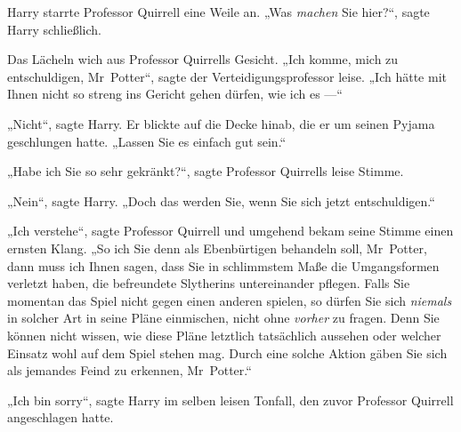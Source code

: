 Harry starrte Professor Quirrell eine Weile an.
„Was \emph{machen} Sie hier?“, sagte Harry schließlich.

Das Lächeln wich aus Professor Quirrells Gesicht.
„Ich komme, mich zu entschuldigen, Mr~Potter“, sagte der Verteidigungsprofessor leise.
„Ich hätte mit Ihnen nicht so streng ins Gericht gehen dürfen, wie ich es —“

„Nicht“, sagte Harry. Er blickte auf die Decke hinab, die er um seinen Pyjama geschlungen hatte.
„Lassen Sie es einfach gut sein.“

„Habe ich Sie so sehr gekränkt?“, sagte Professor Quirrells leise Stimme.

„Nein“, sagte Harry.
„Doch das werden Sie, wenn Sie sich jetzt entschuldigen.“

„Ich verstehe“, sagte Professor Quirrell und umgehend bekam seine Stimme einen ernsten Klang.
„So ich Sie denn als Ebenbürtigen behandeln soll, Mr~Potter, dann muss ich Ihnen sagen, dass Sie in schlimmstem Maße die Umgangsformen verletzt haben, die befreundete Slytherins untereinander pflegen. Falls Sie momentan das Spiel nicht gegen einen anderen spielen, so dürfen Sie sich \emph{niemals} in solcher Art in seine Pläne einmischen, nicht ohne \emph{vorher} zu fragen. Denn Sie können nicht wissen, wie diese Pläne letztlich tatsächlich aussehen oder welcher Einsatz wohl auf dem Spiel stehen mag. Durch eine solche Aktion gäben Sie sich als jemandes Feind zu erkennen, Mr~Potter.“

„Ich bin sorry“, sagte Harry im selben leisen Tonfall, den zuvor Professor Quirrell angeschlagen hatte.

